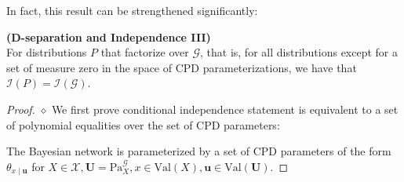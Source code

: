 \documentclass{article}
\newcommand{\bfs}[1]{\textbf{({#1}) }}
\begin{document}
In fact, this result can be strengthened significantly:
\begin{thma}\bfs{D-separation and Independence III}\label{thm:dsep3} \\
For  distributions $P$ that factorize over $\mathcal{G}$, that is, for all distributions except for a set of measure zero in the space of CPD parameterizations, we have that $\mathcal{I}(P)=\mathcal{I}(\mathcal{G})$.
\end{thma}
\begin{proof}
$\diamond$ We first prove conditional independence statement is equivalent to  a set of polynomial equalities over the set of CPD parameters:

The Bayesian network is parameterized by a set of CPD parameters of the form $\theta_{x \mid \boldsymbol{u}}$ for $X \in \mathcal{X}, \boldsymbol{U}=\mathrm{Pa}_{X}^{\mathcal{G}}, x \in \mathrm{Val}(X), \boldsymbol{u} \in \mathrm{Val}(\boldsymbol{U}) .$ %


\end{proof}
\end{document}
